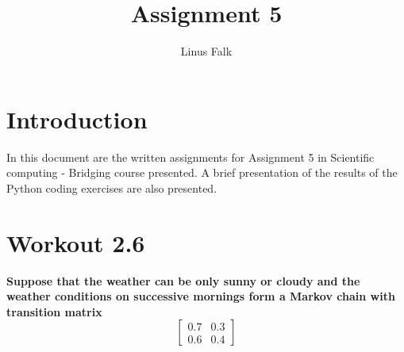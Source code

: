\documentclass[a4paper]{article}
\title{Assignment 5}
\author{Linus Falk}
\begin{document}
\maketitle
\section{Introduction}
In this document are the written assignments for Assignment 5 in Scientific computing - Bridging course presented. A brief presentation of the results of the Python coding exercises are also presented. 

\section*{Workout 2.6}
\textbf{Suppose that the weather can be only sunny or cloudy and the weather conditions on successive mornings form a Markov chain with transition matrix
}
\begin{equation}
\begin{bmatrix} 0.7& 0.3 \\ 0.6& 0.4 \end{bmatrix}
\end{equation}



\end{document}
